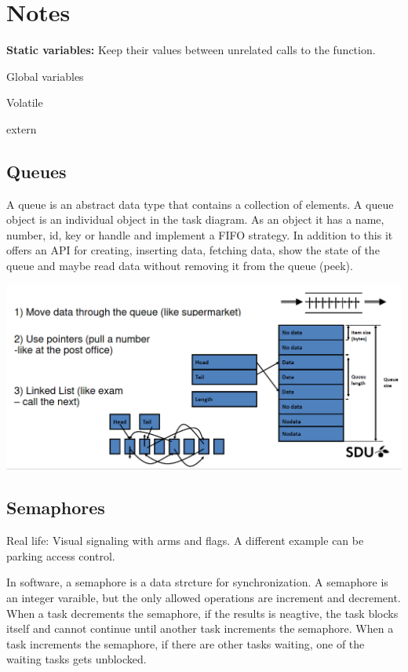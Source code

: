 \section{Notes}


\textbf{Static variables:} Keep their values between unrelated calls to the function.

Global variables

Volatile

extern


\subsection{Queues}

A queue is an abstract data type that contains a collection of elements.
A queue object is an individual object in the task diagram.
As an object it has a name, number, id, key or handle and implement
a FIFO strategy. In addition to this it offers an API for
creating, inserting data, fetching data, show the state of the queue and
maybe read data without removing it from the queue (peek).


\begin{center}
	\includegraphics[width=\textwidth]{images/queue.png}
\end{center}


\subsection{Semaphores}

Real life: Visual signaling with arms and flags. A different example
can be parking access control.

In software, a semaphore is a data strcture for synchronization.
A semaphore is an integer varaible, but the only allowed operations
are increment and decrement. When a task decrements the semaphore, if the
results is neagtive, the task blocks itself and cannot continue until
another task increments the semaphore.
When a task increments the semaphore, if there are other tasks waiting,
one of the waiting tasks gets unblocked.

